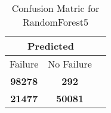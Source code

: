 \begin{table}[] 
\caption{Confusion Matric for RandomForest5} 
\label{Table: Prediction Accuracy-DMDRandomForest5OnlySunEKF-ignoreReflectionEKF-top2perfectNoFailurePrediction-Reflection} 
\centering 
\begin{tabular} 
 {@{}ccc@{}} 
\toprule 
\multicolumn{2}{c}{\textbf{Predicted}}
 \\ \midrule 
\multicolumn{1}{|c|}{Failure} & 
\multicolumn{1}{c|}{No Failure}
 \\ \midrule 
\multicolumn{1}{|c|}{\color{green}\textbf{98278}} & 
\multicolumn{1}{c|}{\color{red}\textbf{292}}
 \\ \midrule 
\multicolumn{1}{|c|}{\color{red}\textbf{21477}} & 
\multicolumn{1}{c|}{\color{green}\textbf{50081}}
 \\ \bottomrule 
\end{tabular} 
\end{table} 
